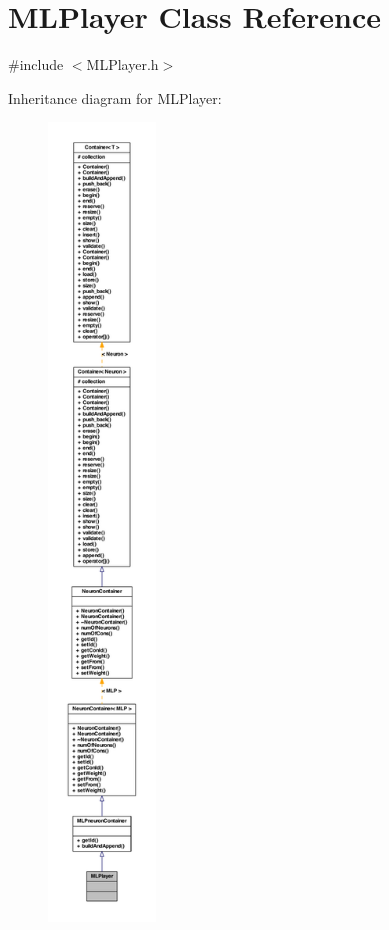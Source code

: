 \hypertarget{class_m_l_player}{
\section{MLPlayer Class Reference}
\label{class_m_l_player}
}


{\ttfamily \#include $<$MLPlayer.h$>$}



Inheritance diagram for MLPlayer:
\nopagebreak
\begin{figure}[H]
\begin{center}
\leavevmode
\includegraphics[height=600pt]{class_m_l_player__inherit__graph}
\end{center}
\end{figure}


